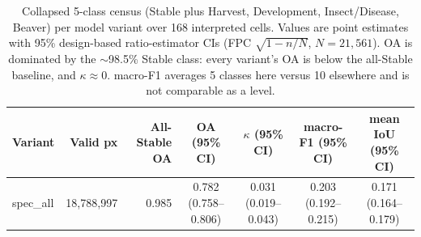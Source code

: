 \begin{table}[t]
\centering
\caption{Collapsed 5-class census (Stable plus Harvest, Development, Insect/Disease, Beaver) per model variant over 168 interpreted cells. Values are point estimates with 95\% design-based ratio-estimator CIs (FPC $\sqrt{1-n/N}$, $N=21{,}561$). OA is dominated by the $\sim$98.5\% Stable class: every variant's OA is below the all-Stable baseline, and $\kappa\approx0$. macro-F1 averages 5 classes here versus 10 elsewhere and is not comparable as a level.}
\label{tab:collapsed5_census}
\begin{tabular}{lrrcccc}
\toprule
Variant & Valid px & All-Stable OA & OA (95\% CI) & $\kappa$ (95\% CI) & macro-F1 (95\% CI) & mean IoU (95\% CI) \\
\midrule
spec_all & 18,788,997 & 0.985 & 0.782 (0.758--0.806) & 0.031 (0.019--0.043) & 0.203 (0.192--0.215) & 0.171 (0.164--0.179) \\
\bottomrule
\end{tabular}
\end{table}
